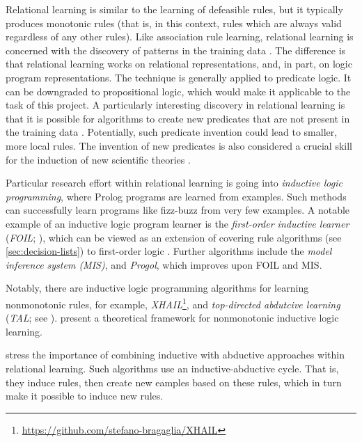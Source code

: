 Relational learning is similar to the learning of defeasible rules, but it typically produces monotonic rules (that is, in this context, rules which are always valid regardless of any other rules). Like association rule learning, relational learning is concerned with the discovery of patterns in the training data \citep{deraedtLogicalRelationalLearning2008}. The difference is that relational learning works on relational representations, and, in part, on logic program representations. The technique is generally applied to predicate logic. It can be downgraded to propositional logic, which would make it applicable to the task of this project. A particularly interesting discovery in relational learning is that it is possible for algorithms to create new predicates that are not present in the training data \citep[p.~797f.]{russellArtificialIntelligenceModern2010}. Potentially, such predicate invention could lead to smaller, more local rules. The invention of new predicates is also considered a crucial skill for the induction of new scientific theories \citep[p.~797f.]{russellArtificialIntelligenceModern2010}.

Particular research effort within relational learning is going into \textit{inductive logic programming}, where Prolog programs are learned from examples. Such methods can successfully learn programs like fizz-buzz from very few examples. A notable example of an inductive logic program learner is the \textit{first-order inductive learner} (\textit{FOIL}; \citet{quinlanLearningLogicalDefinitions1990}), which can be viewed as an extension of covering rule algorithms (see \autoref{sec:decision-lists}) to first-order logic \citep[p.~362f.]{hanDataMiningConcepts2011}. Further algorithms include the \textit{model inference system (MIS)}, and \textit{Progol}, which improves upon FOIL and MIS. 

Notably, there are inductive logic programming algorithms for learning nonmonotonic rules, for example, \textit{XHAIL}\footnote{\url{https://github.com/stefano-bragaglia/XHAIL}}, and \textit{top-directed abdutcive learning} (\textit{TAL}; see \citet{corapiInductiveLogicProgramming2010}). \citet{dimopoulosLearningNonmonotonicLogic1995} present a theoretical framework for nonmonotonic inductive logic learning.

\cite{kakasAbductionArgumentationExplainable2020} stress the importance of combining inductive with abductive approaches within relational learning. Such algorithms use an inductive-abductive cycle. That is, they induce rules, then create new eamples based on these rules, which in turn make it possible to induce new rules.

